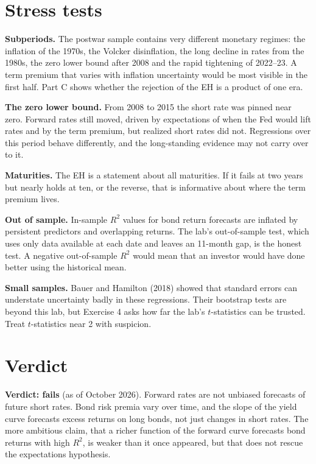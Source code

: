 \section{Stress tests}
\label{sec:10-stress}

\textbf{Subperiods.} The postwar sample contains very different monetary regimes: the inflation of the 1970s, the Volcker disinflation, the long decline in rates from the 1980s, the zero lower bound after 2008 and the rapid tightening of 2022--23. A term premium that varies with inflation uncertainty would be most visible in the first half. Part C shows whether the rejection of the EH is a product of one era.

\textbf{The zero lower bound.} From 2008 to 2015 the short rate was pinned near zero. Forward rates still moved, driven by expectations of when the Fed would lift rates and by the term premium, but realized short rates did not. Regressions over this period behave differently, and the long-standing evidence may not carry over to it.

\textbf{Maturities.} The EH is a statement about all maturities. If it fails at two years but nearly holds at ten, or the reverse, that is informative about where the term premium lives.

\textbf{Out of sample.} In-sample $R^2$ values for bond return forecasts are inflated by persistent predictors and overlapping returns. The lab's out-of-sample test, which uses only data available at each date and leaves an 11-month gap, is the honest test. A negative out-of-sample $R^2$ would mean that an investor would have done better using the historical mean.

\textbf{Small samples.} Bauer and Hamilton (2018) showed that standard errors can understate uncertainty badly in these regressions. Their bootstrap tests are beyond this lab, but Exercise 4 asks how far the lab's $t$-statistics can be trusted. Treat $t$-statistics near 2 with suspicion.

\section{Verdict}
\label{sec:10-verdict}

\begin{callout}
\textbf{Verdict: fails} (as of October 2026). Forward rates are not unbiased forecasts of future short rates. Bond risk premia vary over time, and the slope of the yield curve forecasts excess returns on long bonds, not just changes in short rates. The more ambitious claim, that a richer function of the forward curve forecasts bond returns with high $R^2$, is weaker than it once appeared, but that does not rescue the expectations hypothesis.
\end{callout}

